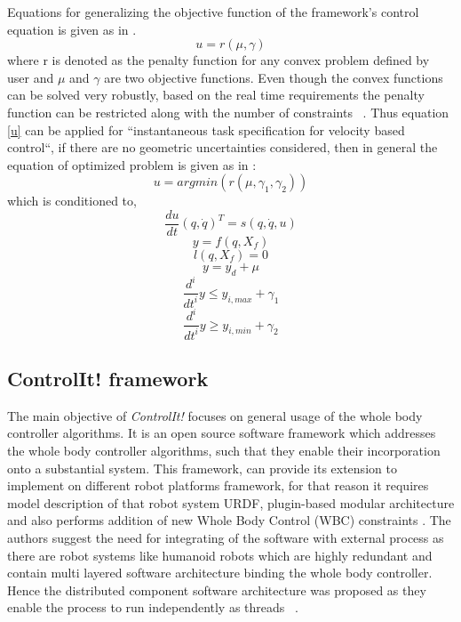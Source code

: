 Equations for generalizing the objective function of the framework's control equation is given as in \cite{decre2009extending}. 
\begin{equation}
 u = r(\mu,\gamma) 
 \label{u}
\end{equation}
where r is denoted as the penalty function for any convex problem defined by user and $\mu$ and $\gamma$ are two objective functions. Even though the convex functions can be solved very robustly, based on the real time requirements the penalty function can be restricted along with the number of constraints    ~\cite{decre2009extending}. Thus equation \ref{u} can be applied for ``instantaneous task specification for velocity based control``, if there are no geometric uncertainties considered, then in general the equation of optimized problem is given as in \cite{decre2013extending}\cite{decre2009extending}:
\begin{equation}
 u = argmin (r(\mu,\gamma_{1},\gamma_{2}))
\end{equation}
which is conditioned to,
$$\frac{du}{dt}(q,\dot{q})^{T} = s(q,\dot{q},u)$$
$$ y = f(q,X_{f}) $$
$$l(q,X_{f}) = 0$$
$$y = y_{d}+\mu$$
$$\frac{d^{i}}{dt^{i}}y \leq  y_{i,max} + \gamma_{1}$$
$$\frac{d^{i}}{dt^{i}}y \geq  y_{i,min} + \gamma_{2}$$
\subsection{ControlIt! framework}
The main objective of \textit{ControlIt!} focuses on general usage of the whole body controller algorithms. It is an open source software framework which addresses the whole body controller algorithms, such that they enable their incorporation onto a substantial system. This framework, can provide its extension to implement on different robot platforms framework, for that reason it requires model description of that robot system URDF, plugin-based modular architecture and also performs addition of new Whole Body Control (WBC) constraints \cite{fok2016controlit}. The authors suggest the need for integrating of the software with external process as there are robot systems like humanoid robots which are highly redundant and contain multi layered software architecture binding the whole body controller. Hence the distributed component software architecture was proposed as they enable the process to run independently as threads ~\cite{fok2016controlit}.


